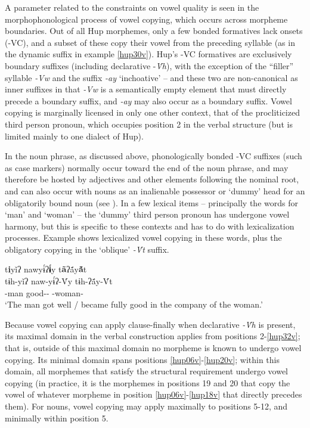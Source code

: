 \documentclass[output=paper]{langscibook}
\begin{document}
A parameter related to the constraints on vowel quality is seen in the morphopho\-no\-log\-ical process of vowel copying, which occurs across morpheme boundaries. Out of all Hup morphemes, only a few bonded formatives lack onsets (-VC), and a subset of these copy their vowel from the preceding syllable (as in the dynamic suffix in example \ref{hup30v}). Hup's -VC formatives are exclusively boundary suffixes (including declarative -\textit{\'{V}h}), with the exception of the ``filler'' syllable \textit{{}-Vw} and the suffix \textit{{}-ay} `inchoative' – and these two are non-canonical as inner suffixes in that \textit{{}-Vw} is a semantically empty element that must directly precede a boundary suffix, and \textit{{}-ay} may also occur as a boundary suffix. Vowel copying is marginally licensed in only one other context, that of the procliticized third person pronoun, which occupies position 2 in the verbal structure (but is limited mainly to one dialect of Hup).

In the noun phrase, as discussed above, phonologically bonded -VC suffixes (such as case markers) normally occur toward the end of the noun phrase, and may therefore be hosted by adjectives and other elements following the nominal root, and can also occur with nouns as an inalienable possessor or `dummy' head for an obligatorily bound noun (see ). In a few lexical items – principally the words for `man' and `woman' – the `dummy' third person pronoun has undergone vowel harmony, but this is specific to these contexts and has to do with lexicalization processes. Example  shows lexicalized vowel copying in these words, plus the obligatory copying in the `oblique' \textit{{}-\'{V}t} suffix.

\ea\label{ex:hup:key:31} 
t\textbf{i}yǐʔ nawyɨ́ʔ\textbf{ɨ́}y t\textbf{ã}ʔã́y\textbf{ã́}t \\
\gll tɨh-yǐʔ naw-yɨ́ʔ-\'{V}y tɨh-ʔ\'{ã}y-\'{V}t \\
\Third\Sg{}-man good-\Tel-\Dynm{} \Third\Sg{}-woman-\Obl{}\\ 
\glt `The man got well / became fully good in the company of the woman.'
\z 

Because vowel copying can apply clause-finally when declarative \textit{{}-\'{V}h} is pres\-ent, its maximal domain in the verbal construction applies from positions 2-\ref{hup32v}; that is, outside of this maximal domain no morpheme is known to undergo vowel copying. Its minimal domain spans positions \ref{hup06v}-\ref{hup20v}; within this domain, all morphemes that satisfy the structural requirement undergo vowel copying (in practice, it is the morphemes in positions 19 and 20 that copy the vowel of whatever morpheme in position \ref{hup06v}-\ref{hup18v} that directly precedes them). For nouns, vowel copying may apply maximally to positions 5-12, and minimally within position 5.
\end{document}
